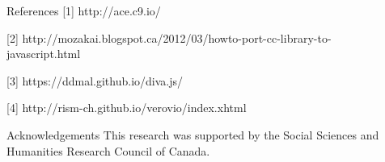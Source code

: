 \documentclass[final]{beamer}
\begin{document}
\begin{frame}[fragile,t]
\begin{minipage}[t][.8\textheight]{\textwidth}
\begin{columns}
\begin{column}{0.95\textwidth}
\begin{block}{}
\begin{columns}
\begin{column}{0.47\textwidth}
            \vfill

            \begin{block}{\large References}
            \footnotesize
            [1] http://ace.c9.io/

            [2] http://mozakai.blogspot.ca/2012/03/howto-port-cc-library-to-javascript.html

            [3] https://ddmal.github.io/diva.js/

            [4] http://rism-ch.github.io/verovio/index.xhtml
            \end{block}   


            \vfill

            \begin{block}{\large Acknowledgements}
            \footnotesize
            This research was supported by the Social Sciences and Humanities Research Council of Canada.
            \end{block}
        \end{column}
        \end{columns}
        \end{block}

    \end{column}

\begin{column}{0.00\textwidth}
\end{column}
\end{columns}
\end{minipage}
\end{frame}
\end{document}
